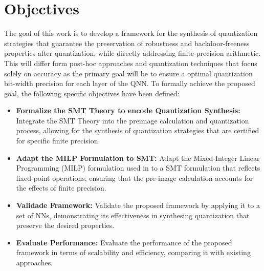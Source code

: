 \begin{comment}
    
    Several works have explored the verification of neural networks, particularly focusing on verification problem like a code problem \cite{cordeiro2025neuralnetworkverificationprogramming}. Some works like \cite{katz2017reluplex,katz2019marabou,abdi2021counterexample,song2023qnnrepair} use SMT solvers to verify the integrity of QNN by checking properties such as robustness\footnote{resistência a perturbações} and safety. However, these approuches typically do not scale well to large models and also do not take into account the fixed-point precision used in quantized models. In contrast, the use of MILP solvers has been proposed to verify the pre-image of QNNs \cite{cai2025certified}. This approach allows for the verification of robustness and backdoor-freeness properties of QNNs. Though the work lacks to consider the fixed-point precision used in quantized models as done by \cite{baranowski2020smt}. It then lays the foundation for our work.
    
\end{comment}

\section{Objectives}

The goal of this work is to develop a framework for the synthesis of quantization strategies that guarantee the preservation of robustness and backdoor-freeness properties after quantization, while directly addressing finite-precision arithmetic. This will differ form post-hoc approaches and quantization techniques that focus solely on accuracy as the primary goal will be to ensure a optimal quantization bit-width precision for each layer of the QNN. To formally achieve the proposed goal, the following specific objectives have been defined:

\begin{itemize}
    \item \textbf{Formalize the SMT Theory to encode Quantization Synthesis:} Integrate the SMT Theory into the preimage calculation and quantization process, allowing for the synthesis of quantization strategies that are certified for specific finite precision.
    \item \textbf{Adapt the MILP Formulation to SMT:} Adapt the Mixed-Integer Linear Programming (MILP) formulation used in \cite{cai2025certified} to a SMT formulation that reflects fixed-point operations, ensuring that the pre-image calculation accounts for the effects of finite precision.
    \item \textbf{Validade Framework:} Validate the proposed framework by applying it to a set of NNs, demonstrating its effectiveness in synthesing quantization that preserve the desired properties.
    \item \textbf{Evaluate Performance:} Evaluate the performance of the proposed framework in terms of scalability and efficiency, comparing it with existing approaches. 
    
\end{itemize}

